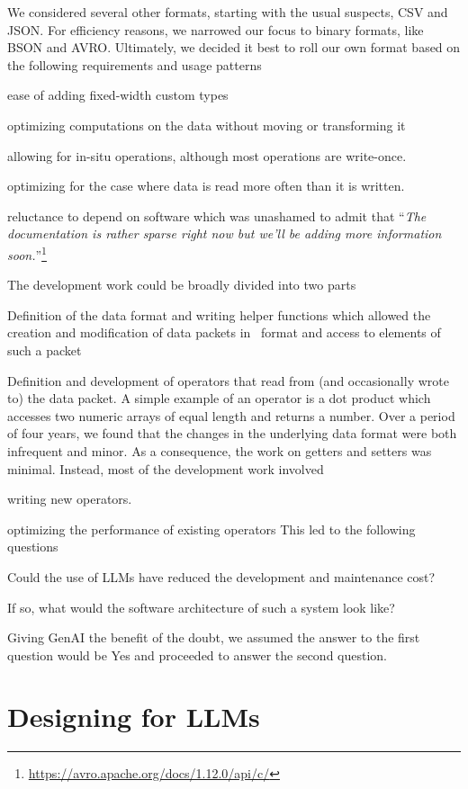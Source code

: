 \documentclass[letterpaper,12pt]{article}
\begin{document}
We considered several other formats, starting with the usual suspects,
 CSV and JSON. For efficiency reasons, we narrowed our focus to binary formats, like BSON
 and AVRO. Ultimately, we decided it best to roll our own format based on the
 following requirements and usage patterns
 \be
 \item ease of adding fixed-width custom types
 \item optimizing computations on the data without moving or
   transforming it
 \item allowing for in-situ operations,
   although most operations are write-once.
 \item optimizing for the case where data is read more 
   often than it is written. 
 \item reluctance to depend on software which was unashamed to admit that ``{\em The documentation is
   rather sparse right now but we’ll be adding more information
   soon.}''\footnote{\url{https://avro.apache.org/docs/1.12.0/api/c/}}
   \ee

The development work could be broadly divided into two parts
\be
\item Definition of the data format and writing helper functions which allowed
  the creation and modification of data packets in \QDF\ format and access to
  elements of such a packet
\item Definition and development of operators that read from (and occasionally
  wrote to) the data packet.
  A simple example of an operator is a dot product which
accesses two numeric arrays of equal length and returns a number. 
  \ee
Over a period of four years, we found that the changes in
the underlying data format were both infrequent and minor.
As a consequence, the work on getters and setters was minimal. 
Instead, most of the development work involved
\be
\item writing new operators. 
\item optimizing the performance of existing operators 
  \ee
This led to the following questions
\be
\item Could the use of LLMs have reduced the development and maintenance cost?
\item If so, what would the software architecture of such a system look like?
  \ee

Giving GenAI the benefit of the doubt, we assumed the answer to the first
question would be Yes and proceeded to answer the second question. 

\section{Designing for LLMs}
\label{designing_for_llms}
\end{document}
